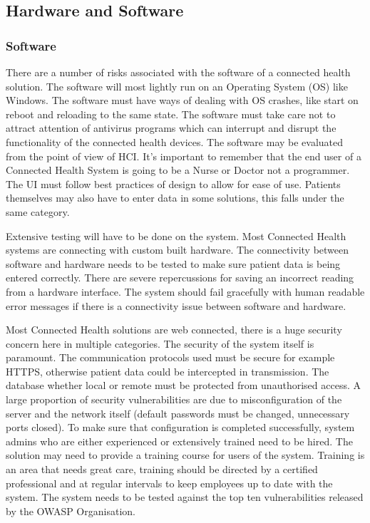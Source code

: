 \subsection{Hardware and Software}

\subsubsection{Software}

There are a number of risks associated with the software of a connected health solution. The software will most lightly run on an Operating System (OS) like Windows. The software must have ways of dealing with OS crashes, like start on reboot and reloading to the same state. The software must take care not to attract attention of antivirus programs which can interrupt and disrupt the functionality of the connected health devices. The software may be evaluated from the point of view of HCI. It’s important to remember that the end user of a Connected Health System is going to be a Nurse or Doctor not a programmer. The UI must follow best practices of design to allow for ease of use. Patients themselves may also have to enter data in some solutions, this falls under the same category.

Extensive testing will have to be done on the system. Most Connected Health systems are connecting with custom built hardware. The connectivity between software and hardware needs to be tested to make sure patient data is being entered correctly. There are severe repercussions for saving an incorrect reading from a hardware interface. The system should fail gracefully with human readable error messages if there is a connectivity issue between software and hardware. 

Most Connected Health solutions are web connected, there is a huge security concern here in multiple categories. The security of the system itself is paramount. The communication protocols used must be secure for example HTTPS, otherwise patient data could be intercepted in transmission. The database whether local or remote must be protected from unauthorised access. A large proportion of security vulnerabilities are due to misconfiguration of the server and the network itself (default passwords must be changed, unnecessary ports closed). To make sure that configuration is completed successfully, system admins who are either experienced or extensively trained need to be hired. The solution may need to provide a training course for users of the system. Training is an area that needs great care, training should be directed by a certified professional and at regular intervals to keep employees up to date with the system. The system needs to be tested against the top ten vulnerabilities released by the OWASP Organisation.

